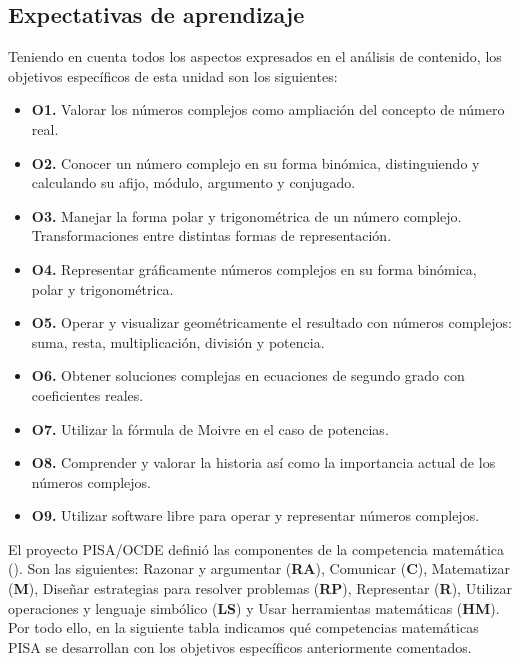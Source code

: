 \documentclass[../main.tex]{memoir}
\begin{document}
\subsection{Expectativas de aprendizaje}

Teniendo en cuenta todos los aspectos expresados en el análisis de contenido, los objetivos específicos de esta unidad son los siguientes:

\begin{itemize}
	\item \textbf{O1.} Valorar los números complejos como ampliación del concepto de número real.
	\item \textbf{O2.} Conocer un número complejo en su forma binómica, distinguiendo y calculando su afijo, módulo, argumento y conjugado.
	\item \textbf{O3.} Manejar la forma polar y trigonométrica de un número complejo. Transformaciones entre distintas formas de representación.
	\item \textbf{O4.} Representar gráficamente números complejos en su forma binómica, polar y trigonométrica.
	\item \textbf{O5.} Operar y visualizar geométricamente el resultado con números complejos: suma, resta, multiplicación, división y potencia.
	\item \textbf{O6.} Obtener soluciones complejas en ecuaciones de segundo grado con coeficientes reales.
	\item \textbf{O7.} Utilizar la fórmula de Moivre en el caso de potencias.
	\item \textbf{O8.} Comprender y valorar la historia así como la importancia actual de los números complejos.
	\item \textbf{O9.} Utilizar software libre para operar y representar números complejos.
\end{itemize}

El proyecto PISA/OCDE definió las componentes de la competencia matemática (\cite{pisaocde}). Son las siguientes: Razonar y argumentar (\textbf{RA}), Comunicar (\textbf{C}), Matematizar (\textbf{M}), Diseñar estrategias para resolver problemas (\textbf{RP}), Representar (\textbf{R}), Utilizar operaciones y lenguaje simbólico (\textbf{LS}) y Usar herramientas matemáticas (\textbf{HM}). \\

Por todo ello, en la siguiente tabla indicamos qué competencias matemáticas PISA se desarrollan con los objetivos específicos anteriormente comentados.
\end{document}

